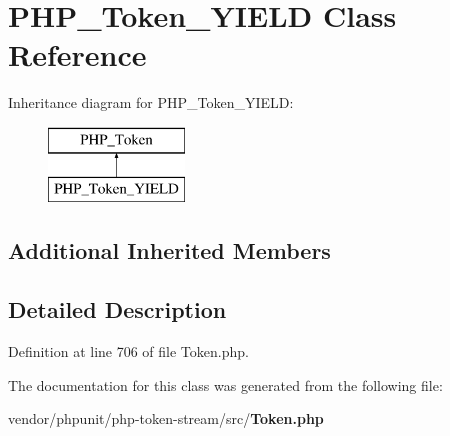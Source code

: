 \section{P\+H\+P\+\_\+\+Token\+\_\+\+Y\+I\+E\+L\+D Class Reference}
\label{class_p_h_p___token___y_i_e_l_d}
Inheritance diagram for P\+H\+P\+\_\+\+Token\+\_\+\+Y\+I\+E\+L\+D\+:\begin{figure}[H]
\begin{center}
\leavevmode
\includegraphics[height=2.000000cm]{class_p_h_p___token___y_i_e_l_d}
\end{center}
\end{figure}
\subsection*{Additional Inherited Members}


\subsection{Detailed Description}


Definition at line 706 of file Token.\+php.



The documentation for this class was generated from the following file\+:\begin{DoxyCompactItemize}
\item 
vendor/phpunit/php-\/token-\/stream/src/{\bf Token.\+php}\end{DoxyCompactItemize}
